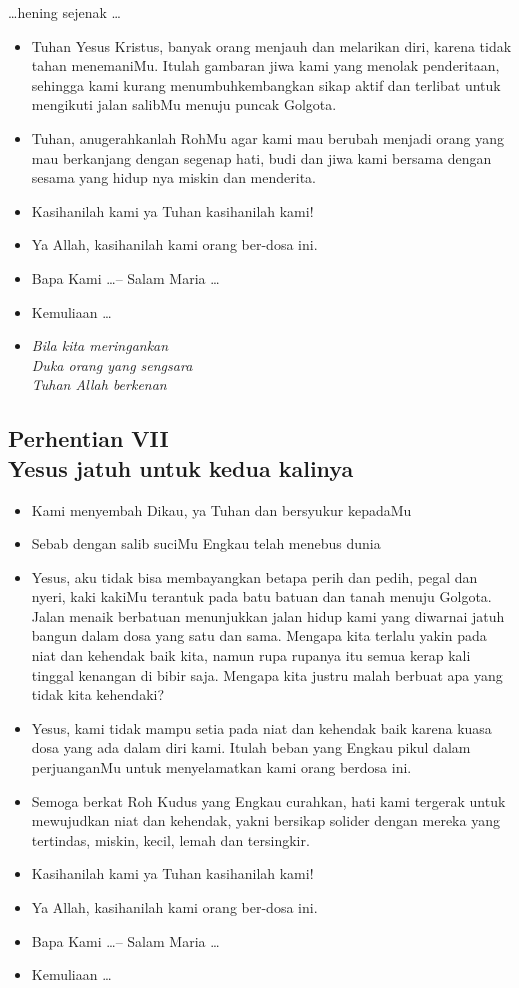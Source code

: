\documentclass[a5paper,headsepline,titlepage,10pt,nnormalheadings,DIVcalc]{scrbook}
\newcommand{\BU}[1]{\begin{itemize} \item[U:] #1 \end{itemize}}
\newcommand{\BP}[1]{\begin{itemize} \item[P:] #1 \end{itemize}}
\newcommand{\BL}[1]{\begin{itemize} \item[L:] #1 \end{itemize}}
\begin{document}
\begin{center}\dots hening sejenak \dots\end{center}

\BP{Tuhan Yesus Kristus, banyak orang menjauh dan melarikan diri, karena tidak tahan menemaniMu. Itulah gambaran jiwa kami yang menolak penderitaan, sehingga kami kurang menumbuhkembangkan sikap aktif dan terlibat untuk mengikuti jalan salibMu menuju puncak Golgota.}
\BU{Tuhan, anugerahkanlah RohMu agar kami mau berubah menjadi orang yang mau berkanjang dengan segenap hati, budi dan jiwa kami bersama dengan sesama yang hidup nya miskin dan menderita.}
\BP{Kasihanilah kami ya Tuhan kasihanilah kami!}
\BU{Ya Allah, kasihanilah kami orang ber-dosa ini.}
\BP{Bapa Kami \dots -- Salam Maria \dots}
\BP{Kemuliaan \dots}

\begin{itemize}
\item[7.] \it{Bila kita meringankan
\\Duka orang yang sengsara\\
Tuhan Allah berkenan}
\end{itemize}



\subsection*{Perhentian VII
\\Yesus jatuh untuk kedua kalinya}

\BP{Kami menyembah Dikau, ya Tuhan dan bersyukur kepadaMu}
\BU{Sebab dengan salib suciMu Engkau telah menebus dunia}
\BL{Yesus, aku tidak bisa membayangkan betapa perih dan pedih, pegal dan nyeri, kaki kakiMu terantuk pada batu batuan dan tanah menuju Golgota. Jalan menaik berbatuan menunjukkan jalan hidup kami yang diwarnai jatuh bangun dalam dosa yang satu dan sama. Mengapa kita terlalu yakin pada niat dan kehendak baik kita, namun rupa rupanya itu semua kerap kali tinggal kenangan di bibir saja. Mengapa kita justru malah berbuat apa yang tidak kita kehendaki?}
\BP{Yesus, kami tidak mampu setia pada niat dan kehendak baik karena kuasa dosa yang ada dalam diri kami. Itulah beban yang Engkau pikul dalam perjuanganMu untuk menyelamatkan kami orang berdosa ini.}
\BU{Semoga berkat Roh Kudus yang Engkau curahkan, hati kami tergerak untuk mewujudkan niat dan kehendak, yakni bersikap solider dengan mereka yang tertindas, miskin, kecil, lemah dan tersingkir.}
\BP{Kasihanilah kami ya Tuhan kasihanilah kami!}
\BU{Ya Allah, kasihanilah kami orang ber-dosa ini.}
\BP{Bapa Kami \dots -- Salam Maria \dots}
\BP{Kemuliaan \dots}
\end{document}
